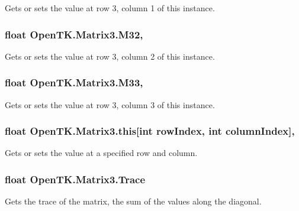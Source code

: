 Gets or sets the value at row 3, column 1 of this instance. 

\hypertarget{struct_open_t_k_1_1_matrix3_af89a8226e4885fe65f1392969c923d20}{
\subsubsection[{M32}]{\setlength{\rightskip}{0pt plus 5cm}float Open\-T\-K.\-Matrix3.\-M32\hspace{0.3cm}{\ttfamily [get]}, {\ttfamily [set]}}}\label{struct_open_t_k_1_1_matrix3_af89a8226e4885fe65f1392969c923d20}


Gets or sets the value at row 3, column 2 of this instance. 

\hypertarget{struct_open_t_k_1_1_matrix3_a2862e6772d76da5809d71713cf375609}{
\subsubsection[{M33}]{\setlength{\rightskip}{0pt plus 5cm}float Open\-T\-K.\-Matrix3.\-M33\hspace{0.3cm}{\ttfamily [get]}, {\ttfamily [set]}}}\label{struct_open_t_k_1_1_matrix3_a2862e6772d76da5809d71713cf375609}


Gets or sets the value at row 3, column 3 of this instance. 

\hypertarget{struct_open_t_k_1_1_matrix3_a25f75c8c136a6e28863a29f3f16ad214}{
\subsubsection[{this[int row\-Index, int column\-Index]}]{\setlength{\rightskip}{0pt plus 5cm}float Open\-T\-K.\-Matrix3.\-this\mbox{[}int row\-Index, int column\-Index\mbox{]}\hspace{0.3cm}{\ttfamily [get]}, {\ttfamily [set]}}}\label{struct_open_t_k_1_1_matrix3_a25f75c8c136a6e28863a29f3f16ad214}


Gets or sets the value at a specified row and column. 

\hypertarget{struct_open_t_k_1_1_matrix3_a0c3de584ab6566c9347a322a98212e9a}{
\subsubsection[{Trace}]{\setlength{\rightskip}{0pt plus 5cm}float Open\-T\-K.\-Matrix3.\-Trace\hspace{0.3cm}{\ttfamily [get]}}}\label{struct_open_t_k_1_1_matrix3_a0c3de584ab6566c9347a322a98212e9a}


Gets the trace of the matrix, the sum of the values along the diagonal. 

